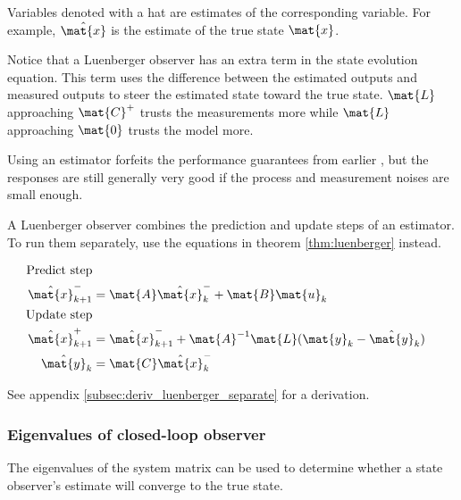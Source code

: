 Variables denoted with a hat are estimates of the corresponding variable. For
example, $\hat{\mat{x}}$ is the estimate of the true \gls{state} $\mat{x}$.

Notice that a Luenberger \gls{observer} has an extra term in the \gls{state}
evolution equation. This term uses the difference between the estimated
\glspl{output} and measured \glspl{output} to steer the estimated \gls{state}
toward the true \gls{state}. $\mat{L}$ approaching $\mat{C}^+$ trusts the
measurements more while $\mat{L}$ approaching $\mat{0}$ trusts the \gls{model}
more.
\begin{remark}
  Using an estimator forfeits the performance guarantees from earlier
  \cite{bib:lqg_guaranteed_margins}, but the responses are still generally very
  good if the process and measurement noises are small enough.
\end{remark}

A Luenberger \gls{observer} combines the prediction and update steps of an
estimator. To run them separately, use the equations in theorem
\ref{thm:luenberger} instead.
\begin{theorem}
  \label{thm:luenberger}
  \begin{align}
    \text{Predict step} \nonumber \\
    \hat{\mat{x}}_{k+1}^- &= \mat{A}\hat{\mat{x}}_k^- + \mat{B}\mat{u}_k \\
    \text{Update step} \nonumber \\
    \hat{\mat{x}}_{k+1}^+ &= \hat{\mat{x}}_{k+1}^- + \mat{A}^{-1}\mat{L}
      (\mat{y}_k - \hat{\mat{y}}_k) \\
    \hat{\mat{y}}_k &= \mat{C} \hat{\mat{x}}_k^-
  \end{align}
\end{theorem}

See appendix \ref{subsec:deriv_luenberger_separate} for a derivation.

\subsubsection{Eigenvalues of closed-loop observer}

The eigenvalues of the system matrix can be used to determine whether a
\gls{state} \gls{observer}'s estimate will converge to the true \gls{state}.


